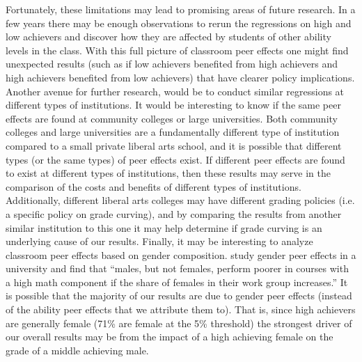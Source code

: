 Fortunately, these limitations may lead to promising areas of future research. 
In a few years there may be enough observations to rerun the regressions on high and low achievers and discover how they are affected by students of other ability levels in the class. 
With this full picture of classroom peer effects one might find unexpected results (such as if low achievers benefited from high achievers and high achievers benefited from low achievers) that have clearer policy implications.
Another avenue for further research, would be to conduct similar regressions at different types of institutions.
It would be interesting to know if the same peer effects are found at community colleges or large universities. 
Both community colleges and large universities are a fundamentally different type of institution compared to a small private liberal arts school, and it is possible that different types (or the same types) of peer effects exist. 
If different peer effects are found to exist at different types of institutions, then these results may serve in the comparison of the costs and benefits of different types of institutions. 
Additionally, different liberal arts colleges may have different grading policies (i.e. a specific policy on grade curving), and by comparing the results from another similar institution to this one it may help determine if grade curving is an underlying cause of our results. 
Finally, it may be interesting to analyze classroom peer effects based on gender composition. 
\citet{oosterbeek2014gender} study gender peer effects in a university and find that ``males, but not females, perform poorer in courses with a high math component if the share of females in their work group increases.'' 
It is possible that the majority of our results are due to gender peer effects (instead of the ability peer effects that we attribute them to). 
That is, since high achievers are generally female (71\% are female at the 5\% threshold) the strongest driver of our overall results may be from the impact of a high achieving female on the grade of a middle achieving male. 

